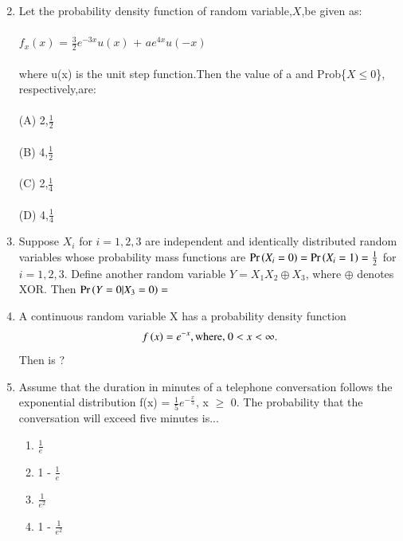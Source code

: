 \begin{enumerate}[label=\thesection.\arabic*.,ref=\thesection.\theenumi]
\begin{enumerate}
\begin{multicols}{2}
\end{multicols}
\end{enumerate}


%
\item Let the probability density function of random variable,$X$,be given as:\\
\\$f_x(x)$ = $\frac{3}{2}$$e^{-3x}$${u(x)}$ + $a$$e^{4x}$${u(-x)}$\\
\\where u(x) is the unit step function.Then the value of a and Prob\{$X\leq0$\}, respectively,are:\\
\\(A) 2,$\frac{1}{2}$\\
\\(B) 4,$\frac{1}{2}$\\
\\(C) 2,$\frac{1}{4}$\\
\\(D) 4,$\frac{1}{4}$\\
\solution


%
\item Suppose $X_i$ for $i = 1, 2, 3$ are independent
and identically distributed random variables
whose probability mass functions are
$\Pr\left(X_i = 0\right) = \Pr\left(X_i = 1\right) = \frac{1}{2}$ for $i = 1, 2, 3$.
Define another random variable $Y = X_1 X_2 \oplus X_3$, where $\oplus$ denotes XOR. Then $\Pr\left(Y = 0|X_3 = 0\right) =$
\\
\solution 


%
\item A continuous random variable X has a probability density function 
\begin{align}
 f\left(x\right) = e^{-x}, \text{where, } 0<x<\infty.
\end{align}
Then  is ?
\solution


%
\item Assume that the duration in minutes of a telephone conversation follows the exponential distribution f(x) = $\frac{1}{5}e^{-\frac{x}{5}}$, x $\ge$ 0. The probability that the conversation will exceed five minutes is...
\begin{enumerate}
\item $\frac{1}{e}$ 
\item 1 - $\frac{1}{e}$ 
\item $\frac{1}{e^2}$ 
\item 1 - $\frac{1}{e^2}$
\end{enumerate}
%
%
\solution



\end{enumerate}
